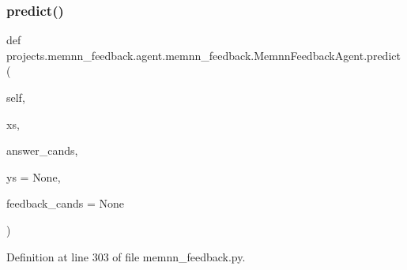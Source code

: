 \subsubsection{\texorpdfstring{predict()}{predict()}}
{\footnotesize\ttfamily def projects.\+memnn\+\_\+feedback.\+agent.\+memnn\+\_\+feedback.\+Memnn\+Feedback\+Agent.\+predict (\begin{DoxyParamCaption}\item[{}]{self,  }\item[{}]{xs,  }\item[{}]{answer\+\_\+cands,  }\item[{}]{ys = {\ttfamily None},  }\item[{}]{feedback\+\_\+cands = {\ttfamily None} }\end{DoxyParamCaption})}



Definition at line 303 of file memnn\+\_\+feedback.\+py.


